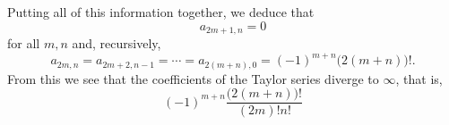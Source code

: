 \begin{solution}
  Putting all of this information together, we deduce that
  \[
    a_{2m+1,n}=0
  \]
  for all \(m,n\) and, recursively,
  \[
    a_{2m,n}=a_{2m+2,n-1}=\dotsb=
    a_{2(m+n),0}=(-1)^{m+n}\bigl(2(m+n)\bigr)!.
  \]
  From this we see that the coefficients of the Taylor series diverge to
  \(\infty\), that is,
  \[
    (-1)^{m+n}\frac{\bigl(2(m+n)\bigr)!}{(2m)!n!}
  \]
\end{solution}

